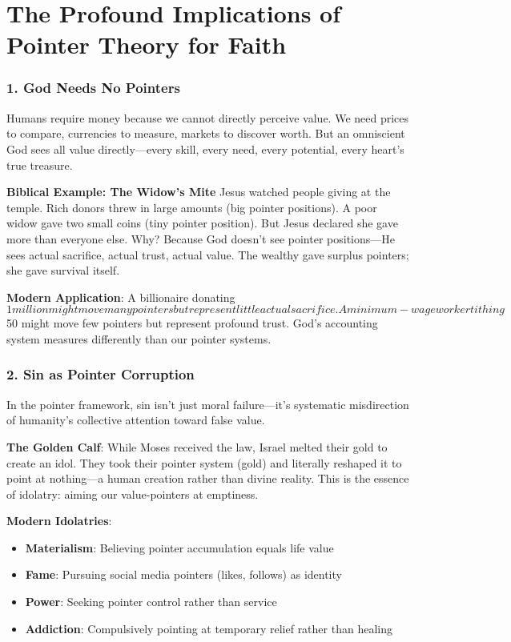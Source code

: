 \documentclass[11pt,oneside]{book}
\begin{document}
\section{The Profound Implications of Pointer Theory for Faith}

\subsubsection{1. God Needs No Pointers}

Humans require money because we cannot directly perceive value. We need prices to compare, currencies to measure, markets to discover worth. But an omniscient God sees all value directly—every skill, every need, every potential, every heart's true treasure.

\textbf{Biblical Example: The Widow's Mite}
Jesus watched people giving at the temple. Rich donors threw in large amounts (big pointer positions). A poor widow gave two small coins (tiny pointer position). But Jesus declared she gave more than everyone else. Why? Because God doesn't see pointer positions—He sees actual sacrifice, actual trust, actual value. The wealthy gave surplus pointers; she gave survival itself.

\textbf{Modern Application}: A billionaire donating $1 million might move many pointers but represent little actual sacrifice. A minimum-wage worker tithing $50 might move few pointers but represent profound trust. God's accounting system measures differently than our pointer systems.

\subsubsection{2. Sin as Pointer Corruption}

In the pointer framework, sin isn't just moral failure—it's systematic misdirection of humanity's collective attention toward false value.

\textbf{The Golden Calf}: While Moses received the law, Israel melted their gold to create an idol. They took their pointer system (gold) and literally reshaped it to point at nothing—a human creation rather than divine reality. This is the essence of idolatry: aiming our value-pointers at emptiness.

\textbf{Modern Idolatries}:
\begin{itemize}
\item \textbf{Materialism}: Believing pointer accumulation equals life value
\item \textbf{Fame}: Pursuing social media pointers (likes, follows) as identity
\item \textbf{Power}: Seeking pointer control rather than service
\item \textbf{Addiction}: Compulsively pointing at temporary relief rather than healing
\end{itemize}
\end{document}
